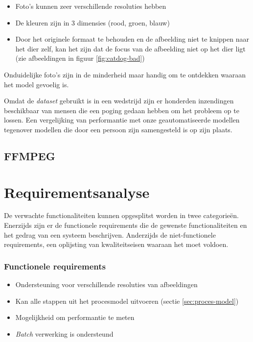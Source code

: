 \begin{itemize}
    \item Foto's kunnen zeer verschillende resoluties hebben
    \item De kleuren zijn in 3 dimensies (rood, groen, blauw)
    \item Door het originele formaat te behouden en de afbeelding niet te knippen naar het dier zelf, kan het zijn dat de focus van de afbeelding niet op het dier ligt (zie afbeeldingen in figuur \ref{fig:catdog-bad})
\end{itemize}

Onduidelijke foto's zijn in de minderheid maar handig om te ontdekken waaraan het model gevoelig is.

Omdat de \textit{dataset} gebruikt is in een wedstrijd zijn er honderden inzendingen beschikbaar van mensen die een poging gedaan hebben om het probleem op te lossen. Een vergelijking van performantie met onze geautomatiseerde modellen tegenover modellen die door een persoon zijn samengesteld is op zijn plaats.

\subsection{FFMPEG}
\label{subsec:ffmpeg}

\section{Requirementsanalyse}
\label{sec:requirements}

De verwachte functionaliteiten kunnen opgesplitst worden in twee categorieën. Enerzijds zijn er de functionele requirements die de gewenste functionaliteiten en het gedrag van een systeem beschrijven. Anderzijds de niet-functionele requirements, een oplijsting van kwaliteitseisen waaraan het moet voldoen.

\subsubsection{Functionele requirements}
\label{subsubsec:fr}

\begin{itemize}
    \item Ondersteuning voor verschillende resoluties van afbeeldingen
    \item Kan alle stappen uit het procesmodel uitvoeren (sectie \ref{sec:proces-model})
    \item Mogelijkheid om performantie te meten
    \item \textit{Batch} verwerking is ondersteund
\end{itemize}

